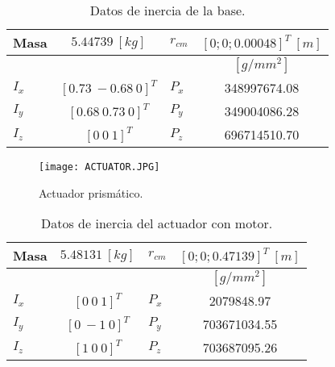 \begin{table}[hb!]
 \begin{center}
\begin{tabular}{lclc}
 Masa & $ 5.44739\ [kg]$ & $r_{cm}$ &  $[0; 0; 0.00048]^T \ [m]$ \\
 \hline
 & & & $[g/mm^2]$\\
 \hline
 $ I_x $ & $ [0.73\ -0.68\ 0]^T $ & $ P_x $ & 348997674.08\\
 $ I_y $ & $ [0.68\ 0.73\ 0]^T $ & $ P_y $ & 349004086.28\\
 $ I_z $ & $ [0 \ 0 \ 1]^T $ & $ P_z $ & 696714510.70
\end{tabular}
\end{center}
\caption{Datos de inercia de la base.}
\label{tab: inertia table base}
\end{table}


\begin{figure}[htb!]
    \centering
    \texttt{[image: ACTUATOR.JPG]}
    \caption{Actuador prismático.}
    \label{fig: cad motor}
\end{figure}

\begin{table}[hb!]
 \begin{center}
\begin{tabular}{lclc}


% 


 Masa & $ 5.48131 \ [kg]$ & $r_{cm}$ & $[0; 0; 0.47139]^T \ [m]$ \\
 \hline
 & & & $[g/mm^2]$\\
 \hline
 $ I_x $ & $ [0 \ 0 \ 1]^T $ & $ P_x $ & 2079848.97\\
 $ I_y $ & $ [0 \ -1 \ 0]^T $ & $ P_y $ & 703671034.55\\
 $ I_z $ & $ [1 \ 0 \ 0]^T $ & $ P_z $ & 703687095.26
\end{tabular}
\end{center}
\caption{Datos de inercia del actuador con motor.}
\label{tab: inertia table motor}
\end{table}


